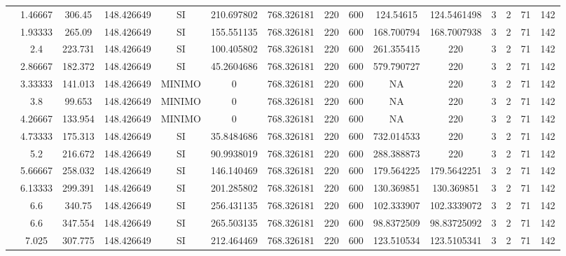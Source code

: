 \begin{table}[H]
{\begin{tabular}{|c|c|c|c|c|c|c|c|c|c|c|c|c|c|c|}
\cline{2-15}    & 1.46667 & 306.45 & 148.426649 & SI  & 210.697802 & 768.326181 & 220 & 600 & 124.54615 & 124.5461498 & 3   & 2   & 71  & 142 \bigstrut\\
\cline{2-15}    & 1.93333 & 265.09 & 148.426649 & SI  & 155.551135 & 768.326181 & 220 & 600 & 168.700794 & 168.7007938 & 3   & 2   & 71  & 142 \bigstrut\\
\cline{2-15}    & 2.4 & 223.731 & 148.426649 & SI  & 100.405802 & 768.326181 & 220 & 600 & 261.355415 & 220 & 3   & 2   & 71  & 142 \bigstrut\\
\cline{2-15}    & 2.86667 & 182.372 & 148.426649 & SI  & 45.2604686 & 768.326181 & 220 & 600 & 579.790727 & 220 & 3   & 2   & 71  & 142 \bigstrut\\
\cline{2-15}    & 3.33333 & 141.013 & 148.426649 & MINIMO & 0   & 768.326181 & 220 & 600 & NA  & 220 & 3   & 2   & 71  & 142 \bigstrut\\
\cline{2-15}    & 3.8 & 99.653 & 148.426649 & MINIMO & 0   & 768.326181 & 220 & 600 & NA  & 220 & 3   & 2   & 71  & 142 \bigstrut\\
\cline{2-15}    & 4.26667 & 133.954 & 148.426649 & MINIMO & 0   & 768.326181 & 220 & 600 & NA  & 220 & 3   & 2   & 71  & 142 \bigstrut\\
\cline{2-15}    & 4.73333 & 175.313 & 148.426649 & SI  & 35.8484686 & 768.326181 & 220 & 600 & 732.014533 & 220 & 3   & 2   & 71  & 142 \bigstrut\\
\cline{2-15}    & 5.2 & 216.672 & 148.426649 & SI  & 90.9938019 & 768.326181 & 220 & 600 & 288.388873 & 220 & 3   & 2   & 71  & 142 \bigstrut\\
\cline{2-15}    & 5.66667 & 258.032 & 148.426649 & SI  & 146.140469 & 768.326181 & 220 & 600 & 179.564225 & 179.5642251 & 3   & 2   & 71  & 142 \bigstrut\\
\cline{2-15}    & 6.13333 & 299.391 & 148.426649 & SI  & 201.285802 & 768.326181 & 220 & 600 & 130.369851 & 130.369851 & 3   & 2   & 71  & 142 \bigstrut\\
\cline{2-15}    & 6.6 & 340.75 & 148.426649 & SI  & 256.431135 & 768.326181 & 220 & 600 & 102.333907 & 102.3339072 & 3   & 2   & 71  & 142 \bigstrut\\
\cline{2-15}    & 6.6 & 347.554 & 148.426649 & SI  & 265.503135 & 768.326181 & 220 & 600 & 98.8372509 & 98.83725092 & 3   & 2   & 71  & 142 \bigstrut\\
\cline{2-15}    & 7.025 & 307.775 & 148.426649 & SI  & 212.464469 & 768.326181 & 220 & 600 & 123.510534 & 123.5105341 & 3   & 2   & 71  & 142 \bigstrut\\

\end{tabular}}
\end{table}
